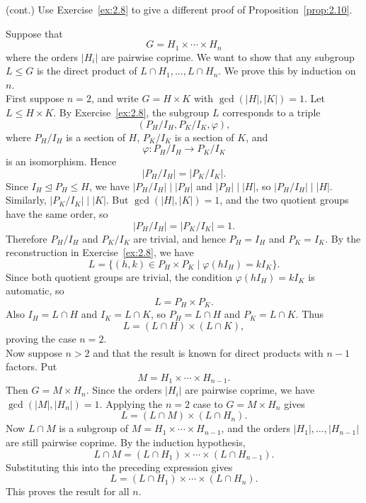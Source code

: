 \documentclass[../Odyssey_Project.tex]{subfiles}
\begin{document}
\begin{exercise}
\label{ex:2.9}
(cont.) Use Exercise~\ref{ex:2.8} to give a different proof of Proposition~\ref{prop:2.10}.
\end{exercise}
\begin{solution}
    Suppose that
    \[
        G = H_1 \times \cdots \times H_n
    \]
    where the orders $|H_i|$ are pairwise coprime. We want to show that any subgroup $L \leq G$ is the direct product of $L \cap H_1,\dots,L \cap H_n$. We prove this by induction on $n$. \\
    First suppose $n = 2$, and write $G = H \times K$ with $\gcd(|H|,|K|) = 1$. Let $L \leq H \times K$. By Exercise~\ref{ex:2.8}, the subgroup $L$ corresponds to a triple
    \[
        (P_H/I_H,P_K/I_K,\varphi),
    \]
    where $P_H/I_H$ is a section of $H$, $P_K/I_K$ is a section of $K$, and
    \[
        \varphi \colon P_H/I_H \to P_K/I_K
    \]
    is an isomorphism. Hence
    \[
        |P_H/I_H| = |P_K/I_K|.
    \]
    Since $I_H \trianglelefteq P_H \leq H$, we have $|P_H/I_H| \mid |P_H|$ and $|P_H| \mid |H|$, so $|P_H/I_H| \mid |H|$. Similarly, $|P_K/I_K| \mid |K|$. But $\gcd(|H|,|K|) = 1$, and the two quotient groups have the same order, so
    \[
        |P_H/I_H| = |P_K/I_K| = 1.
    \]
    Therefore $P_H/I_H$ and $P_K/I_K$ are trivial, and hence $P_H = I_H$ and $P_K = I_K$. By the reconstruction in Exercise~\ref{ex:2.8}, we have
    \[
        L
        =
        \{(h,k) \in P_H \times P_K \mid \varphi(hI_H) = kI_K\}.
    \]
    Since both quotient groups are trivial, the condition $\varphi(hI_H) = kI_K$ is automatic, so
    \[
        L = P_H \times P_K.
    \]
    Also $I_H = L \cap H$ and $I_K = L \cap K$, so $P_H = L \cap H$ and $P_K = L \cap K$. Thus
    \[
        L = (L \cap H) \times (L \cap K),
    \]
    proving the case $n = 2$. \\
    Now suppose $n > 2$ and that the result is known for direct products with $n-1$ factors. Put
    \[
        M = H_1 \times \cdots \times H_{n-1}.
    \]
    Then $G = M \times H_n$. Since the orders $|H_i|$ are pairwise coprime, we have $\gcd(|M|,|H_n|) = 1$. Applying the $n = 2$ case to $G = M \times H_n$ gives
    \[
        L = (L \cap M) \times (L \cap H_n).
    \]
    Now $L \cap M$ is a subgroup of $M = H_1 \times \cdots \times H_{n-1}$, and the orders $|H_1|,\dots,|H_{n-1}|$ are still pairwise coprime. By the induction hypothesis,
    \[
        L \cap M = (L \cap H_1) \times \cdots \times (L \cap H_{n-1}).
    \]
    Substituting this into the preceding expression gives
    \[
        L = (L \cap H_1) \times \cdots \times (L \cap H_n).
    \]
    This proves the result for all $n$.
\end{solution}
\end{document}
